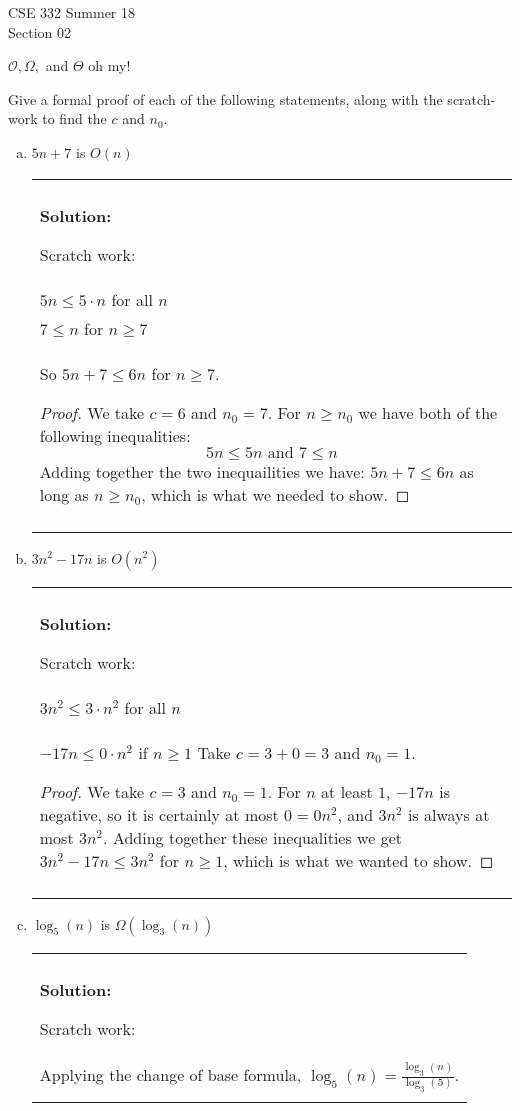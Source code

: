 \documentclass[12pt]{article}
\newenvironment{solution}
	{\begin{center}
	\begin{tabular}{|p{0.9\textwidth}|}
	\hline\\
	\textbf{Solution:}
	}
	{\\\\
	\hline
	\end{tabular}
	\end{center}
	}
\begin{document}
\vspace*{-2em}
{\large CSE 332 Summer 18\\
Section 02}
\vspace{-1em}
	
\begin{center}
	{\huge \color{purple} $\mathcal{O}, \Omega,$ and $\Theta$ oh my!}
\end{center}

Give a formal proof of each of the following statements, along with the scratch-work to find the $c$ and $n_0$. 

\begin{enumerate}[(a)]
	\item $5n + 7$ is $O(n)$
		\begin{solution}
			Scratch work:\\
			$5n \leq 5\cdot n$ for all $n$\\
			$7 \leq n$ for $n \geq 7$\\
			So $5n + 7 \leq 6n$ for $n\geq 7$.
			
			\begin{proof}
				We take $c = 6$ and $n_0 = 7$. For $n \geq n_0$ we have both of the following inequalities:
				\[5n \leq 5n \text{ and }7 \leq n\] 
				Adding together the two inequailities we have:
				$5n + 7 \leq 6n$ as long as $n \geq n_0$, which is what we needed to show.
			\end{proof}
			
		\end{solution}
	\item $3n^2 - 17n$ is $O(n^2)$
		\begin{solution}
			Scratch work:\\
			$3n^2 \leq 3\cdot n^2$ for all $n$\\
			$-17n \leq 0\cdot n^2$ if $n \geq 1$
			Take $c = 3+0 = 3$ and $n_0 = 1$.
			
			\begin{proof}
				We take $c=3$ and $n_0=1$. 
				For $n$ at least $1$, $-17n$ is negative, so it is certainly at most $0 = 0n^2$, and $3n^2$ is always at most $3n^2$. Adding together these inequalities we get $3n^2 - 17n \leq 3n^2$ for $n \geq 1$, which is what we wanted to show.
			\end{proof}
		\end{solution}
		
	\item $\log_5(n)$ is $\Omega(\log_3(n))$
		\begin{solution}
			Scratch work:\\
			Applying the change of base formula, $\log_5(n) = \frac{\log_3(n)}{\log_3(5)}$.
			

\end{solution}
\end{enumerate}
\end{document}
